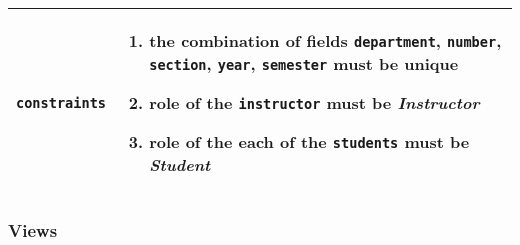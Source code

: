 \begin{table}[H]
\begin{tabular}[H]{r|p{4in}}
        \texttt{constraints} & 
            \vspace{-7mm}
            \begin{enumerate}[leftmargin=5mm, itemsep=0em, parsep=0em]
                \item the combination of fields \texttt{department},
                        \texttt{number},
                        \hspace{2em}\texttt{section},
                        \texttt{year},
                        \texttt{semester} must be unique
                \item role of the \texttt{instructor} must be \emph{Instructor}
                \item role of the each of the \texttt{students} must be
                        \emph{Student}
            \end{enumerate} \vspace{-9mm}\\
        \hline
    \end{tabular}
    \renewcommand{\arraystretch}{1}
    
\end{table}

\subsubsection{Views}

